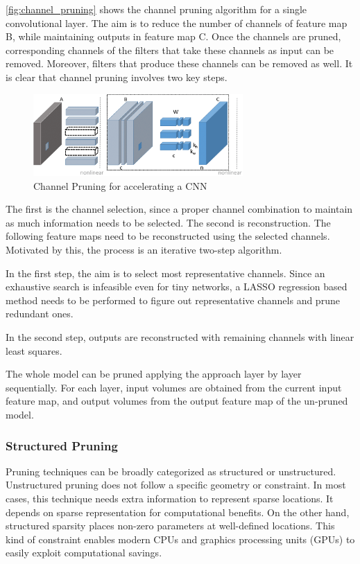 \autoref{fig:channel_pruning} shows the channel pruning algorithm for a
single convolutional layer.
The aim is to reduce the number of channels of feature map B, while maintaining
outputs in feature map C.
Once the channels are pruned, corresponding channels of the filters that take
these channels as input can be removed. Moreover, filters that produce these
channels can be removed as well. It is clear that channel pruning involves
two key steps.

\begin{figure}[ht]
    \includegraphics[width=8cm]{images/pruning/channel_pruning.png}
    \centering
    \caption{Channel Pruning for accelerating a CNN}\label{fig:channel_pruning}
\end{figure}

The first is the channel selection, since a proper channel combination to
maintain as much information needs to be selected.
The second is reconstruction. The following feature maps need to be
reconstructed using the selected channels. Motivated by this, the process is an
iterative two-step algorithm.

In the first step, the aim is to select most representative channels.
Since an exhaustive search is infeasible even for tiny networks, a LASSO
regression based method needs to be performed to figure out representative
channels and prune redundant ones.

In the second step, outputs are reconstructed with remaining channels with
linear least squares.

The whole model can be pruned applying the approach layer by layer
sequentially. For each layer, input volumes are obtained from the current input
feature map, and output volumes from the output feature map of the un-pruned
model.\cite{He_2017}

\subsubsection{Structured Pruning}
Pruning techniques can be broadly categorized as structured or unstructured.
Unstructured pruning does not follow a specific geometry or constraint. In most
cases, this technique needs extra information to represent sparse locations. It
depends on sparse representation for computational benefits. On the other hand,
structured sparsity places non-zero parameters at well-defined locations. This
kind of constraint enables modern CPUs and graphics processing units (GPUs) to
easily exploit computational savings.

